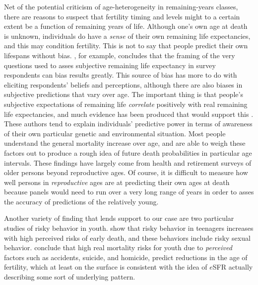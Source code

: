 Net of the potential criticism of age-heterogeneity in remaining-years classes,
there are reasons to suspect that fertility timing and levels might to a certain
extent be a function of remaining years of life. Although one's own age at death
is unknown, individuals do have a \textit{sense} of their own remaining life
expectancies, and this may condition fertility. This is not to say that people 
predict their own lifespans without bias. \citet{payne2013life}, for example,
concludes that the framing of the very questions used to asses subjective
remaining life expectancy in survey respondents can bias results greatly. This
source of bias has more to do with eliciting respondents' beliefs and
perceptions, although there are also biases in subjective predictions that vary
over age. The important thing is that people's subjective expectations of
remaining life \textit{correlate} positively with real remaining life
expectancies, and much evidence has been produced that would support
this \citep{hurd1995evaluation, mirowsky1999subjective, hurd2002predictive,
perozek2008using, delavande2011differential, post2012longevity}. These authors
tend to explain individuals' predictive power in terms of awareness of
their own particular genetic and environmental situation. Most people
understand the general mortality increase over age, and are able to
weigh these factors out to produce a rough idea of future death 
probabilities in particular age intervals. These findings have largely come from
health and retirement surveys of older persons beyond reproductive ages. Of
course, it is difficult to measure how well persons in \textit{reproductive}
ages are at predicting their own ages at death because panels would need to
run over a very long range of years in order to asses the accuracy of
predictions of the relatively young. 

Another variety of finding that lends support to our case are
two particular studies of risky behavior in youth. \citet{borowsky2009health}
show that risky behavior in teenagers increases with high perceived risks of early death, and these
behaviors include risky sexual behavior. \citet{wilson1997life} conclude that
high real mortality risks for youth due to \textit{perceived} factors such as 
accidents, suicide, and homicide, predict reductions in the age of fertility,
which at least on the surface is consistent with the idea of $e$SFR actually describing 
some sort of underlying pattern. 

